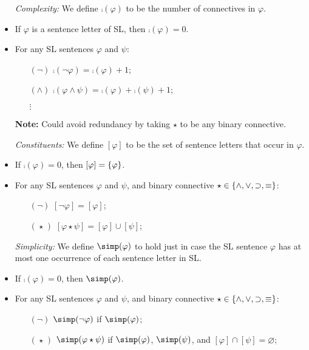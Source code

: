 \documentclass[a4paper, 11pt]{article} %
\begin{document}
\begin{itemize}
  \item[\it Complexity:] We define $\comp(\varphi)$ to be the number of connectives in $\varphi$.
      \item If $\varphi$ is a sentence letter of SL, then $\comp(\varphi)=0$.
      \item For any SL sentences $\varphi$ and $\psi$: 
    \begin{itemize}
      \item[$(\neg)$] $\comp(\neg \varphi)=\comp(\varphi)+1$;
      \item[$(\wedge)$] $\comp(\varphi \wedge \psi)=\comp(\varphi)+\comp(\psi)+1$;
      \item[] $\vdots$
    \end{itemize}
  \item[\bf Note:] Could avoid redundancy by taking $\star$ to be any binary connective. 
  \item[\it Constituents:] We define $[\varphi]$ to be the set of sentence letters that occur in $\varphi$. %
      \item If $\comp(\varphi)=0$, then $[\varphi]=\lbrace\varphi\rbrace$.
      \item For any SL sentences $\varphi$ and $\psi$, and binary connective $\star\in\lbrace\wedge,\vee,\supset,\equiv\rbrace$: 
    \begin{itemize}
      \item[$(\neg)$] $[\neg \varphi]=[\varphi]$;
      \item[$(\hspace{1pt}\star\hspace{1pt})$] $[\varphi \star \psi]=[\varphi] \cup [\psi]$;
    \end{itemize}
  \item[\it Simplicity:] We define $\simp(\varphi)$ to hold just in case the SL sentence $\varphi$ has at most one occurrence of each sentence letter in SL.
      \item If $\comp(\varphi)=0$, then $\simp(\varphi)$.
      \item For any SL sentences $\varphi$ and $\psi$, and binary connective $\star\in\lbrace\wedge,\vee,\supset,\equiv\rbrace$: 
    \begin{itemize}
      \item[$(\neg)$] $\simp(\neg \varphi)$ if $\simp(\varphi)$;
      \item[$(\hspace{1pt}\star\hspace{1pt})$] $\simp(\varphi \star \psi)$ if $\simp(\varphi)$, $\simp(\psi)$, and $[\varphi]\cap[\psi]=\varnothing$;

\end{itemize}
\end{itemize}
\end{document}
